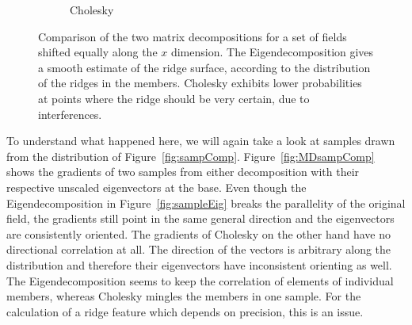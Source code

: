 \begin{figure}[t]
\begin{subfigure}[b]{0.49\textwidth}
        \caption{Cholesky}
        \label{fig:shiftXcholesky}
    \end{subfigure}
    \caption{Comparison of the two matrix decompositions for a set
    of fields shifted equally along the $x$ dimension. The 
    Eigendecomposition gives a smooth estimate of the ridge surface,
    according to the distribution of the ridges in the members.
    Cholesky exhibits lower probabilities at points where the
    ridge should be very certain, due to interferences.}
    \label{fig:decomps}
\end{figure}
\indent To understand what happened here, we will again take a look at
samples drawn from the distribution of Figure~\ref{fig:sampComp}.
Figure~\ref{fig:MDsampComp} shows the gradients of two samples from
either decomposition with their respective unscaled eigenvectors at the
base. Even though the Eigendecomposition in Figure~\ref{fig:sampleEig}
breaks the parallelity of the original field, the gradients still point
in the same general direction and the eigenvectors are consistently
oriented. The gradients of Cholesky on the other hand have no
directional correlation at all. The direction of the vectors is
arbitrary along the distribution and therefore their eigenvectors
have inconsistent orienting as well. The Eigendecomposition seems
to keep the correlation of elements of individual members, whereas
Cholesky mingles the members in one sample. For the calculation of
a ridge feature which depends on precision, this is an issue.\\
